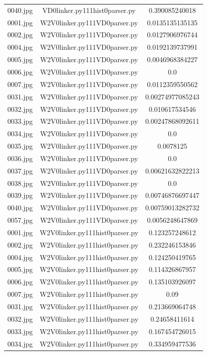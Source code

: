 \documentclass[a4paper,10pt]{article}
\begin{document}
\begin{table}[htbp]
\begin{tabular}{|c|c|c|}
0040.jpg&VD0linker.py111hist0parser.py&0.390085240018\\
0001.jpg&W2V0linker.py111VD0parser.py&0.0135135135135\\
0002.jpg&W2V0linker.py111VD0parser.py&0.0127906976744\\
0004.jpg&W2V0linker.py111VD0parser.py&0.0192139737991\\
0005.jpg&W2V0linker.py111VD0parser.py&0.0046968384227\\
0006.jpg&W2V0linker.py111VD0parser.py&0.0\\
0007.jpg&W2V0linker.py111VD0parser.py&0.0112359550562\\
0031.jpg&W2V0linker.py111VD0parser.py&0.00274977085243\\
0032.jpg&W2V0linker.py111VD0parser.py&0.010617534546\\
0033.jpg&W2V0linker.py111VD0parser.py&0.00247868092611\\
0034.jpg&W2V0linker.py111VD0parser.py&0.0\\
0035.jpg&W2V0linker.py111VD0parser.py&0.0078125\\
0036.jpg&W2V0linker.py111VD0parser.py&0.0\\
0037.jpg&W2V0linker.py111VD0parser.py&0.00621632822213\\
0038.jpg&W2V0linker.py111VD0parser.py&0.0\\
0039.jpg&W2V0linker.py111VD0parser.py&0.00746876697447\\
0040.jpg&W2V0linker.py111VD0parser.py&0.00759013282732\\
0057.jpg&W2V0linker.py111VD0parser.py&0.0056248647869\\
0001.jpg&W2V0linker.py111hist0parser.py&0.123257248612\\
0002.jpg&W2V0linker.py111hist0parser.py&0.232246153846\\
0004.jpg&W2V0linker.py111hist0parser.py&0.124250419765\\
0005.jpg&W2V0linker.py111hist0parser.py&0.114326867957\\
0006.jpg&W2V0linker.py111hist0parser.py&0.135103926097\\
0007.jpg&W2V0linker.py111hist0parser.py&0.09\\
0031.jpg&W2V0linker.py111hist0parser.py&0.213669064748\\
0032.jpg&W2V0linker.py111hist0parser.py&0.24658411614\\
0033.jpg&W2V0linker.py111hist0parser.py&0.167454726015\\
0034.jpg&W2V0linker.py111hist0parser.py&0.334959477536\\

\end{tabular}
\end{table}
\end{document}
